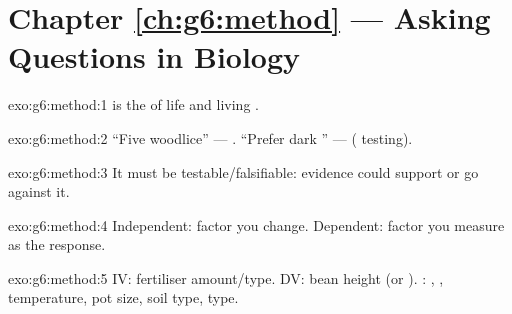 \section*{Chapter \ref{ch:g6:method} --- Asking Questions in Biology}

\begin{solution}{exo:g6:method:1}
 is the  of life and living .
\end{solution}

\begin{solution}{exo:g6:method:2}
``Five woodlice'' --- . ``Prefer dark '' ---
 ( testing).
\end{solution}

\begin{solution}{exo:g6:method:3}
It must be testable/falsifiable: evidence could support or go against
it.
\end{solution}

\begin{solution}{exo:g6:method:4}
Independent: factor you change. Dependent: factor you measure as the
response.
\end{solution}

\begin{solution}{exo:g6:method:5}
IV: fertiliser amount/type. DV: bean height (or ). :
, , temperature, pot size, soil type,  type.
\end{solution}

